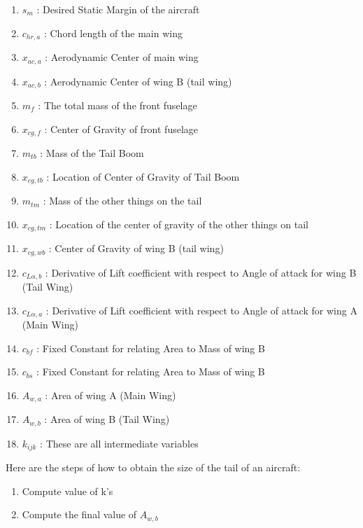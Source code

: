 \begin{enumerate}
\item $s_{m}$ : Desired Static Margin of the aircraft
\item $c_{hr,a}$ : Chord length of the main wing
\item $x_{ac,a}$ : Aerodynamic Center of main wing
\item $x_{ac,b}$ : Aerodynamic Center of wing B (tail wing)
\item $m_{f}$ : The total mass of the front fuselage
\item $x_{cg,f}$ : Center of Gravity of front fuselage
\item $m_{tb}$ : Mass of the Tail Boom
\item $x_{cg,tb}$ : Location of Center of Gravity of Tail Boom
\item $m_{tm}$ : Mass of the other things on the tail
\item $x_{cg,tm}$ : Location of the center of gravity of the other things on tail
\item $x_{cg,wb}$ : Center of Gravity of wing B (tail wing)
\item $c_{L\alpha,b}$ : Derivative of Lift coefficient with respect to Angle of attack for wing B (Tail Wing)
\item $c_{L\alpha,a}$ : Derivative of Lift coefficient with respect to Angle of attack for wing A (Main Wing)
\item $c_{bf}$ : Fixed Constant for relating Area to Mass of wing B
\item $c_{bs}$ : Fixed Constant for relating Area to Mass of wing B
\item $A_{w,a}$ : Area of wing A (Main Wing)
\item $A_{w,b}$ : Area of wing B (Tail Wing)
\item $k_{ijk}$ : These are all intermediate variables
\end{enumerate}
Here are the steps of how to obtain the size of the tail of an aircraft:
\begin{enumerate}
\item Compute value of k's
\item Compute the final value of $A_{w,b}$
\end{enumerate}


